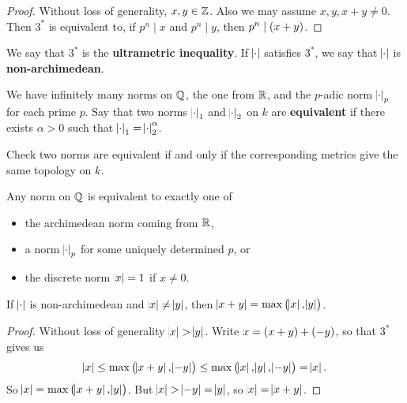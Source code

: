 \begin{proof}
Without loss of generality, $ x, y \in \mathbb{Z} $. Also we may assume $ x, y, x + y \ne 0 $. Then $ 3^* $ is equivalent to, if $ p^n \mid x $ and $ p^n \mid y $, then $ p^n \mid \br{x + y} $.
\end{proof}

\begin{definition}
We say that $ 3^* $ is the \textbf{ultrametric inequality}. If $ \abs{\cdot} $ satisfies $ 3^* $, we say that $ \abs{\cdot} $ is \textbf{non-archimedean}.
\end{definition}

We have infinitely many norms on $ \mathbb{Q} $, the one from $ \mathbb{R} $, and the $ p $-adic norm $ \abs{\cdot}_p $ for each prime $ p $. Say that two norms $ \abs{\cdot}_1 $ and $ \abs{\cdot}_2 $ on $ k $ are \textbf{equivalent} if there exists $ \alpha > 0 $ such that $ \abs{\cdot}_1 = \abs{\cdot}_2^\alpha $.

\begin{exercise*}
Check two norms are equivalent if and only if the corresponding metrics give the same topology on $ k $.
\end{exercise*}

\begin{theorem}
Any norm on $ \mathbb{Q} $ is equivalent to exactly one of
\begin{itemize}
\item the archimedean norm coming from $ \mathbb{R} $,
\item a norm $ \abs{\cdot}_p $ for some uniquely determined $ p $, or
\item the discrete norm $ \abs{x} = 1 $ if $ x \ne 0 $.
\end{itemize}
\end{theorem}

\begin{lemma}
\label{lem:2.7}
If $ \abs{\cdot} $ is non-archimedean and $ \abs{x} \ne \abs{y} $, then $ \abs{x + y} = \max\br{\abs{x}, \abs{y}} $.
\end{lemma}

\begin{proof}
Without loss of generality $ \abs{x} > \abs{y} $. Write $ x = \br{x + y} + \br{-y} $, so that $ 3^* $ gives us
$$ \abs{x} \le \max\br{\abs{x + y}, \abs{-y}} \le \max\br{\abs{x}, \abs{y}, \abs{-y}} = \abs{x}. $$
So $ \abs{x} = \max\br{\abs{x + y}, \abs{y}} $. But $ \abs{x} > \abs{-y} = \abs{y} $, so $ \abs{x} = \abs{x + y} $.
\end{proof}


